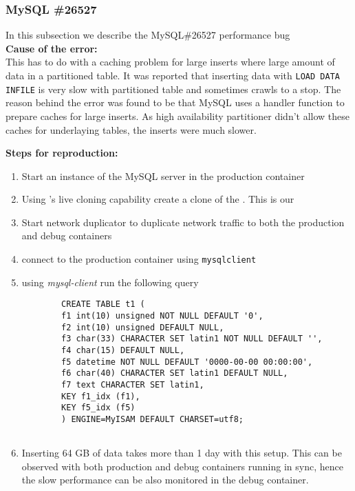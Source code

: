 \subsubsection{MySQL \#26527}

In this subsection we describe the MySQL\#26527 performance bug \\

\noindent \textbf{Cause of the error:} \\

This has to do with a caching problem for large inserts where large amount of data in a partitioned table.
It was reported that inserting data with \texttt{LOAD DATA INFILE} is very slow with partitioned table and sometimes crawls to a stop.
The reason behind the error was found to be that MySQL uses a handler function to prepare caches for large inserts.
As high availability partitioner didn't allow these caches for underlaying tables, the inserts were much slower.

\noindent \textbf{Steps for reproduction:} \\

\begin{adjustwidth}{0.5cm}{}
	\begin{enumerate}
		\item Start an instance of the MySQL server in the production container
		\item Using \parikshan's live cloning capability create a clone of the \productioncontainer. This is our \debugcontainer
		\item Start network duplicator to duplicate network traffic to both the production and debug containers
		\item connect to the production container using \texttt{mysqlclient}
		\item using \emph{mysql-client} run the following query
		
		\begin{lstlisting}
		CREATE TABLE t1 (
		f1 int(10) unsigned NOT NULL DEFAULT '0',
		f2 int(10) unsigned DEFAULT NULL,
		f3 char(33) CHARACTER SET latin1 NOT NULL DEFAULT '',
		f4 char(15) DEFAULT NULL,
		f5 datetime NOT NULL DEFAULT '0000-00-00 00:00:00',
		f6 char(40) CHARACTER SET latin1 DEFAULT NULL,
		f7 text CHARACTER SET latin1,
		KEY f1_idx (f1),
		KEY f5_idx (f5)
		) ENGINE=MyISAM DEFAULT CHARSET=utf8;
		
		\end{lstlisting}
		
		\item Inserting 64 GB of data takes more than 1 day with this setup. This can be observed with both production and debug containers running in sync, hence the slow performance can be also monitored in the debug container.
		
	\end{enumerate}
\end{adjustwidth}	


